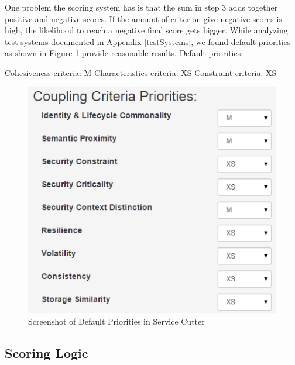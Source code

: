 \begin{minipage}[t]{0.5\textwidth}

One problem the scoring system has is that the sum in step 3 adds together positive and negative scores. If the amount of criterion give negative scores is high, the likelihood to reach a negative final score gets bigger. While analyzing test systems documented in Appendix \ref{testSystems}, we found default priorities as shown in Figure \ref{fig:priorities} provide reasonable results.
\newline \newline
Default priorities:

Cohesiveness criteria: M\newline
Characteristics criteria: XS\newline 
Constraint criteria: XS\newline

\end{minipage}
\begin{minipage}[t]{0.6\textwidth}
	\begin{figure}[H]
		\begin{center}
			\includegraphics[scale=0.5]{images/priorities.png}
			\caption{Screenshot of Default Priorities in Service Cutter}
			\label{fig:priorities}
		\end{center}
	\end{figure}
\end{minipage}

\subsection{Scoring Logic}

